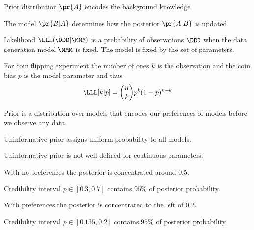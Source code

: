 \documentclass[landscape,footrule]{foils}
\begin{document}

\vspace*{1cm}
\begin{triangles}
\item Prior distribution $\pr{A}$ encodes the background knowledge
\item The model $\pr{B|A}$  determines how the posterior $\pr{A|B}$ is updated 
\end{triangles}


Likelihood $\LLL(\DDD|\MMM)$ is a probability of observations $\DDD$ when the data generation model $\MMM$ is fixed.
The model is fixed by the set of parameters.

For coin flipping experiment the number of ones $k$ is the observation and the coin bias $p$ is the model paramater and thus
\begin{align*}
\LLL[k|p]=\binom{n}{k}p^k(1-p)^{n-k}
\end{align*}

Prior is a distribution over models that encodes our preferences of models before we observe any data.
\begin{triangles}
\item Uninformative prior assigns uniform probability to all models.
\item Uninformative prior is not well-defined for continuous parameters.  
\end{triangles}
   


\vspace*{-0.5cm}

\begin{triangles}
\item With no preferences the posterior is concentrated around 0.5.
\item Credibility interval $p\in[0.3,0.7]$ contains $95\%$ of posterior probability.
\end{triangles}


\vspace*{-0.5cm}

\begin{triangles}
\item With preferences the posterior is concentrated to the left of 0.2.
\item Credibility interval $p\in[0.135,0.2]$ contains $95\%$ of posterior probability.
\end{triangles}
\end{document}
